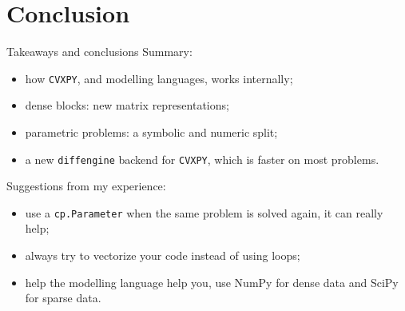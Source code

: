 \documentclass[10pt,mathserif,aspectratio=169]{beamer}
\newcommand{\bul}{\setlength\itemsep{1.1ex}}
\newcommand{\de}{\texttt{diffengine}}
\newcommand{\cvxpy}{\texttt{CVXPY}}
\begin{document}
\section{Conclusion}

\begin{frame}[fragile]{Takeaways and conclusions}
\vspace{-0.5ex}
{\small Summary:}
\vspace{0.5ex}
\begin{itemize}\small\bul
  \item how \cvxpy{}, and modelling languages, works internally;
  \item dense blocks: {\color{polyblue}new matrix representations};
  \item parametric problems: a {\color{polyblue}symbolic and numeric split};
  \item a new \de{} backend for \cvxpy{}, which is faster on most problems.
\end{itemize}

\vspace{2.5ex}
{\small Suggestions from my experience:}
\vspace{0.5ex}
\begin{itemize}\small\bul
  \item use a {\color{polyblue}\texttt{cp.Parameter}} when the same problem is solved again, it can really help;
  \item always try to {\color{polyblue}vectorize} your code instead of using loops;
  \item help the modelling language help you, use NumPy for dense data and SciPy for sparse data.
\end{itemize}

\end{frame}
\end{document}
